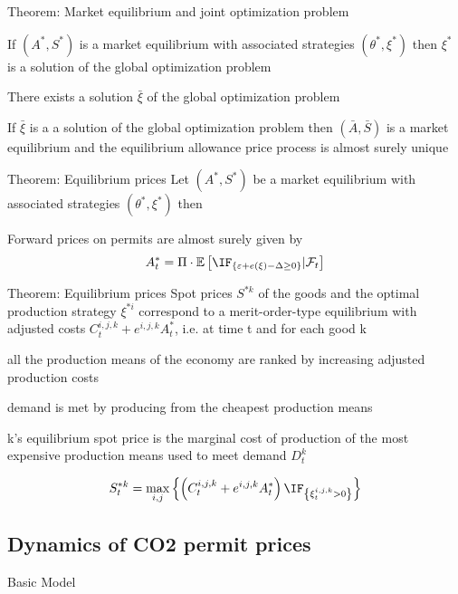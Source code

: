 
{Theorem: Market equilibrium and joint optimization problem}


	If $(A^*,S^*)$ is a market equilibrium with associated strategies $(\theta^*,\xi^*)$ then $\xi^*$ is a solution of the global optimization problem

	There exists a solution $\bar{\xi}$ of the global optimization problem

	If $\bar{\xi}$ is a a solution of the global optimization problem then $(\bar{A}, \bar{S})$ is a market equilibrium and the equilibrium allowance price process is almost surely unique



{Theorem: Equilibrium prices}
Let $(A^*,S^*)$ be a market equilibrium with associated strategies $(\theta^*,\xi^*)$ then

Forward prices on permits are almost surely given by \[
A^*_t = \Pi \cdot \mathbb{E} \left[ \IF_{\left\{ \varepsilon + e(\xi) - \Delta \ge 0 \right\}} | \mathcal{F}_t \right]
\]

{Theorem: Equilibrium prices}
 Spot prices $S^{*k}$ of the goods and the optimal production strategy $\xi^{*i}$ correspond to a merit-order-type equilibrium with adjusted costs $C_t^{i,j,k} + e^{i,j,k} A_t^*$, i.e. at time t and for each good k


	all the production means of the economy are ranked by increasing adjusted production costs

	demand is met by producing from the cheapest production means

	k's equilibrium spot price is the marginal cost of production of the most expensive production means used to meet demand $D_t^k$


\[
S_t^{*k} = \max_{i,j} \left\{ \left(C_t^{i,j,k} + e^{i,j,k} A_t^* \right) \IF_{\left\{\xi_t^{i,j,k}>0\right\}}\right\}
\]

\subsection{Dynamics of CO2 permit prices}

{Basic Model}

